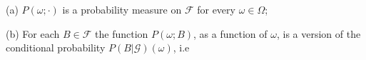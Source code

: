 (a) $P(\omega; \cdot)$ is a probability measure on $\mathcal{F}$ for every $\omega \in \Omega$;

(b) For each $B \in \mathcal{F}$ the function $P(\omega; B)$, as a function of $\omega$, is a version of the conditional probability $P(B | \mathcal{G})(\omega)$, i.e
